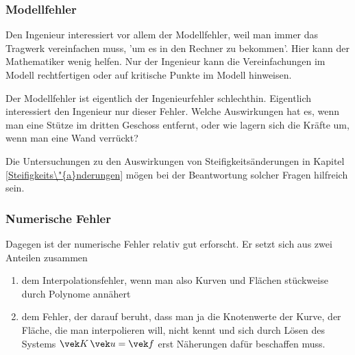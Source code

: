 {{{{{\textcolor{blau2}{\subsubsection*{Modellfehler}}}
Den Ingenieur interessiert vor allem der Modellfehler, weil man immer das Tragwerk vereinfachen muss, 'um es in den Rechner zu bekommen'. Hier kann der Mathematiker wenig helfen. Nur der Ingenieur kann die Vereinfachungen im Modell rechtfertigen oder auf kritische Punkte im Modell hinweisen.

Der Modellfehler ist eigentlich der Ingenieurfehler schlechthin. Eigentlich interessiert den Ingenieur nur dieser Fehler. Welche Auswirkungen hat es, wenn man eine St\"{u}tze im dritten Geschoss entfernt, oder wie lagern sich die Kr\"{a}fte um, wenn man eine Wand verr\"{u}ckt?

Die Untersuchungen zu den Auswirkungen von Steifigkeits\"{a}nderungen in Kapitel \ref{Steifigkeits\"{a}nderungen} m\"{o}gen bei der Beantwortung solcher Fragen hilfreich sein.

{\textcolor{blau2}{\subsubsection*{Numerische Fehler}}}
Dagegen ist der numerische Fehler relativ gut erforscht. Er setzt sich aus zwei Anteilen zusammen

\begin{enumerate}
  \item dem Interpolationsfehler, wenn man also Kurven und Fl\"{a}chen st\"{u}ckweise durch Polynome ann\"{a}hert
  \item dem Fehler, der darauf beruht, dass man ja die Knotenwerte der Kurve, der Fl\"{a}che, die man interpolieren will, nicht kennt und sich durch L\"{o}sen des  Systems $\vek K\,\vek u = \vek f$ erst N\"{a}herungen daf\"{u}r beschaffen muss.
\end{enumerate}

}}}}

